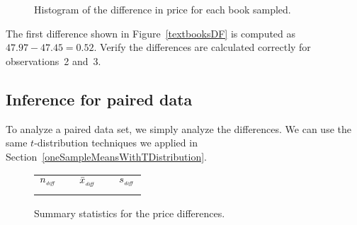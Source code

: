 \begin{figure}[h]
  \centering
  \caption{Histogram of the difference in price for
      each book sampled.}
  \label{diffInTextbookPricesF18}
\end{figure}

\begin{exercisewrap}
\begin{nexercise}
The first difference shown in Figure~\ref{textbooksDF}
is computed as $47.97 - 47.45 = 0.52$.
Verify the differences are calculated correctly for
observations~2 and~3.\footnotemark{}
\end{nexercise}
\end{exercisewrap}


\D{\newpage}
\subsection{Inference for paired data}

To analyze a paired data set,
we simply analyze the differences.
We can use the same $t$-distribution techniques
we applied in
Section~\ref{oneSampleMeansWithTDistribution}.

\begin{figure}[h]
\centering
\begin{tabular}{ccccc}
\hline
$n_{_{\text{\emph{diff}}}}$	&\hspace{3mm}& $\bar{x}_{_{\text{\emph{diff}}}}$	&\hspace{3mm}& $s_{_{\text{\emph{diff}}}}$ \vspace{1mm}\\
\uclabookN{}  && \uclabookM{}  && \uclabookSD{} \\
\hline
\end{tabular}
\caption{Summary statistics for the \uclabookN{} price differences.}
\label{textbooksSummaryStats}
\end{figure}


